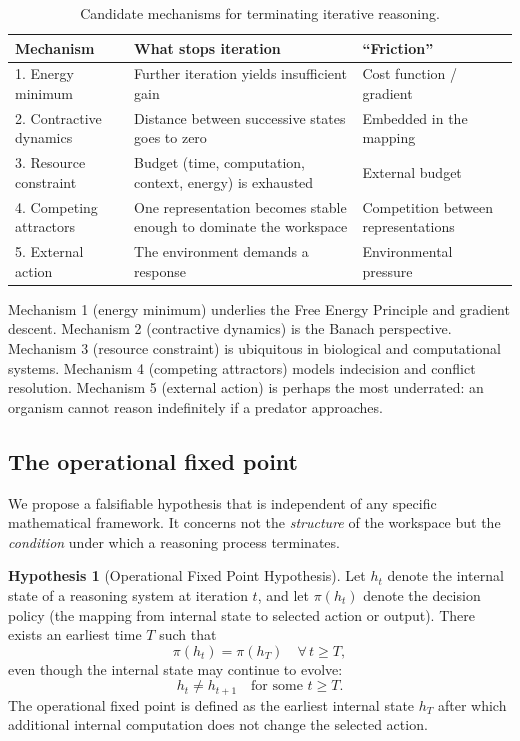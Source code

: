 \documentclass[11pt,a4paper]{article}
\theoremstyle{definition}
\newtheorem{hypothesis}{Hypothesis}
\begin{document}
\begin{table}[htbp]
\centering
\begin{tabular}{@{}lp{3.5cm}p{4.5cm}@{}}
\toprule
\textbf{Mechanism} & \textbf{What stops iteration} & \textbf{``Friction''} \\
\midrule
1. Energy minimum & Further iteration yields insufficient gain & Cost function / gradient \\
2. Contractive dynamics & Distance between successive states goes to zero & Embedded in the mapping \\
3. Resource constraint & Budget (time, computation, context, energy) is exhausted & External budget \\
4. Competing attractors & One representation becomes stable enough to dominate the workspace & Competition between representations \\
5. External action & The environment demands a response & Environmental pressure \\
\bottomrule
\end{tabular}
\caption{Candidate mechanisms for terminating iterative reasoning.}
\label{tab:termination}
\end{table}

\noindent
Mechanism 1 (energy minimum) underlies the Free Energy Principle and gradient
 descent. Mechanism 2 (contractive dynamics) is the Banach perspective.
Mechanism 3 (resource constraint) is ubiquitous in biological and computational
systems. Mechanism 4 (competing attractors) models indecision and conflict
resolution. Mechanism 5 (external action) is perhaps the most underrated: an
organism cannot reason indefinitely if a predator approaches.

\subsection{The operational fixed point}

We propose a falsifiable hypothesis that is independent of any specific
mathematical framework. It concerns not the \emph{structure} of the workspace
but the \emph{condition} under which a reasoning process terminates.

\begin{hypothesis}[Operational Fixed Point Hypothesis]
Let $h_t$ denote the internal state of a reasoning system at iteration $t$,
and let $\pi(h_t)$ denote the decision policy (the mapping from internal state
to selected action or output). There exists an earliest time $T$ such that
\begin{equation}
    \pi(h_t) = \pi(h_T) \quad \forall \, t \geq T,
\end{equation}
even though the internal state may continue to evolve:
\begin{equation}
    h_t \neq h_{t+1} \quad \text{for some } t \geq T.
\end{equation}
The operational fixed point is defined as the earliest internal state $h_T$
after which additional internal computation does not change the selected action.
\end{hypothesis}
\end{document}

